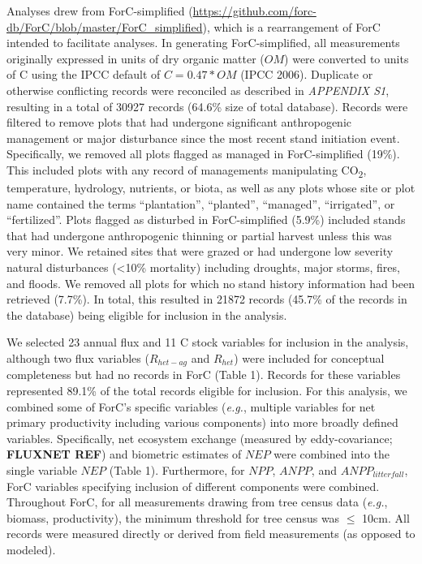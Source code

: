 \documentclass[
]{article}
\begin{document}
Analyses drew from ForC-simplified
(\url{https://github.com/forc-db/ForC/blob/master/ForC_simplified}),
which is a rearrangement of ForC intended to facilitate analyses. In
generating ForC-simplified, all measurements originally expressed in
units of dry organic matter (\(OM\)) were converted to units of C using
the IPCC default of \(C = 0.47 * OM\) (IPCC 2006). Duplicate or
otherwise conflicting records were reconciled as described in
\emph{APPENDIX S1}, resulting in a total of 30927 records (64.6\% size
of total database). Records were filtered to remove plots that had
undergone significant anthropogenic management or major disturbance
since the most recent stand initiation event. Specifically, we removed
all plots flagged as managed in ForC-simplified (19\%). This included
plots with any record of managements manipulating CO\textsubscript{2},
temperature, hydrology, nutrients, or biota, as well as any plots whose
site or plot name contained the terms ``plantation'', ``planted'',
``managed'', ``irrigated'', or ``fertilized''. Plots flagged as
disturbed in ForC-simplified (5.9\%) included stands that had undergone
anthropogenic thinning or partial harvest unless this was very minor. We
retained sites that were grazed or had undergone low severity natural
disturbances (\textless10\% mortality) including droughts, major storms,
fires, and floods. We removed all plots for which no stand history
information had been retrieved (7.7\%). In total, this resulted in 21872
records (45.7\% of the records in the database) being eligible for
inclusion in the analysis.

We selected 23 annual flux and 11 C stock variables for inclusion in the
analysis, although two flux variables (\(R_{het-ag}\) and \(R_{het}\))
were included for conceptual completeness but had no records in ForC
(Table 1). Records for these variables represented 89.1\% of the total
records eligible for inclusion. For this analysis, we combined some of
ForC's specific variables (\emph{e.g.}, multiple variables for net
primary productivity including various components) into more broadly
defined variables. Specifically, net ecosystem exchange (measured by
eddy-covariance; \textbf{FLUXNET REF}) and biometric estimates of
\(NEP\) were combined into the single variable \(NEP\) (Table 1).
Furthermore, for \(NPP\), \(ANPP\), and \(ANPP_{litterfall}\), ForC
variables specifying inclusion of different components were combined.
Throughout ForC, for all measurements drawing from tree census data
(\emph{e.g.}, biomass, productivity), the minimum threshold for tree
census was \(\le\) 10cm. All records were measured directly or derived
from field measurements (as opposed to modeled).
\end{document}
